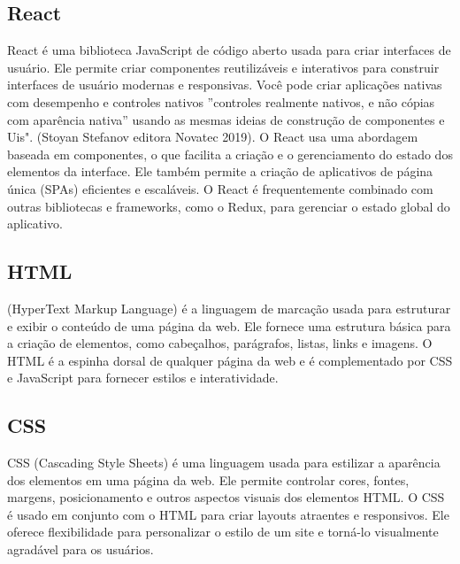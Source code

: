 \subsection{React}
React é uma biblioteca JavaScript de código aberto usada para criar interfaces de usuário. Ele permite criar componentes reutilizáveis e interativos para construir interfaces de usuário modernas e responsivas.  Você pode criar aplicações nativas com desempenho e controles
nativos ''controles realmente nativos, e não cópias com aparência nativa'' usando as mesmas ideias de construção de componentes e Uis". (Stoyan Stefanov editora Novatec 2019).
O React usa uma abordagem baseada em componentes, o que facilita a criação e o gerenciamento do estado dos elementos da interface. Ele também permite a criação de aplicativos de página única (SPAs) eficientes e escaláveis. O React é frequentemente combinado com outras bibliotecas e frameworks, como o Redux, para gerenciar o estado global do aplicativo. 

\subsection{HTML}
(HyperText Markup Language) é a linguagem de marcação usada para estruturar e exibir o conteúdo de uma página da web. Ele fornece uma estrutura básica para a criação de elementos, como cabeçalhos, parágrafos, listas, links e imagens. O HTML é a espinha dorsal de qualquer página da web e é complementado por CSS e JavaScript para fornecer estilos e interatividade.

\subsection{CSS}
CSS (Cascading Style Sheets) é uma linguagem usada para estilizar a aparência dos elementos em uma página da web. Ele permite controlar cores, fontes, margens, posicionamento e outros aspectos visuais dos elementos HTML. O CSS é usado em conjunto com o HTML para criar layouts atraentes e responsivos. Ele oferece flexibilidade para personalizar o estilo de um site e torná-lo visualmente agradável para os usuários. 




